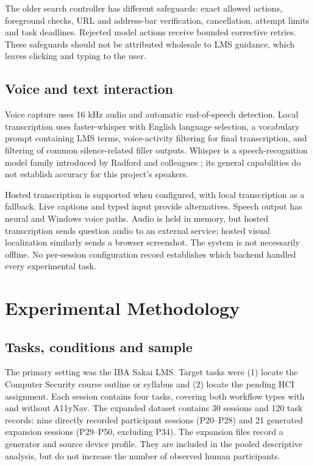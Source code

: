 \documentclass[11pt,a4paper]{article}
\begin{document}
The older search controller has different safeguards: exact allowed actions, foreground checks, URL and address-bar verification, cancellation, attempt limits and task deadlines. Rejected model actions receive bounded corrective retries. These safeguards should not be attributed wholesale to LMS guidance, which leaves clicking and typing to the user.

\subsection{Voice and text interaction}
Voice capture uses 16 kHz audio and automatic end-of-speech detection. Local transcription uses faster-whisper with English language selection, a vocabulary prompt containing LMS terms, voice-activity filtering for final transcription, and filtering of common silence-related filler outputs. Whisper is a speech-recognition model family introduced by Radford and colleagues \cite{radford}; its general capabilities do not establish accuracy for this project's speakers.

Hosted transcription is supported when configured, with local transcription as a fallback. Live captions and typed input provide alternatives. Speech output has neural and Windows voice paths. Audio is held in memory, but hosted transcription sends question audio to an external service; hosted visual localization similarly sends a browser screenshot. The system is not necessarily offline. No per-session configuration record establishes which backend handled every experimental task.

\section{Experimental Methodology}
\subsection{Tasks, conditions and sample}
The primary setting was the IBA Sakai LMS. Target tasks were (1) locate the Computer Security course outline or syllabus and (2) locate the pending HCI assignment. Each session contains four tasks, covering both workflow types with and without A11yNav. The expanded dataset contains 30 sessions and 120 task records: nine directly recorded participant sessions (P20--P28) and 21 generated expansion sessions (P29--P50, excluding P34). The expansion files record a generator and source device profile. They are included in the pooled descriptive analysis, but do not increase the number of observed human participants.
\end{document}
